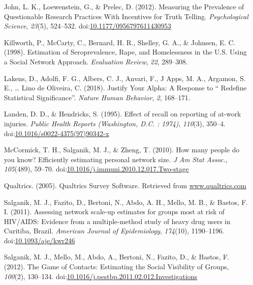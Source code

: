 \documentclass[jou]{apa6}
\theoremstyle{definition}
\theoremstyle{definition}
\theoremstyle{definition}
\theoremstyle{remark}
\begin{document}
\hypertarget{ref-John2012}{}
John, L. K., Loewenstein, G., \& Prelec, D. (2012). Measuring the
Prevalence of Questionable Research Practices With Incentives for Truth
Telling. \emph{Psychological Science}, \emph{23}(5), 524--532.
doi:\href{https://doi.org/10.1177/0956797611430953}{10.1177/0956797611430953}

\hypertarget{ref-Killworth1998a}{}
Killworth, P., McCarty, C., Bernard, H. R., Shelley, G. A., \& Johnsen,
E. C. (1998). Estimation of Seroprevalence, Rape, and Homelessness in
the U.S. Using a Social Network Approach. \emph{Evaluation Review},
\emph{22}, 289--308.

\hypertarget{ref-Lakensabc1860}{}
Lakens, D., Adolfi, F. G., Albers, C. J., Anvari, F., J Apps, M. A.,
Argamon, S. E., \ldots{} Lino de Oliveira, C. (2018). Justify Your
Alpha: A Response to `` Redefine Statistical Significance''.
\emph{Nature Human Behavior}, \emph{2}, 168--171.

\hypertarget{ref-Landen1995}{}
Landen, D. D., \& Hendricks, S. (1995). Effect of recall on reporting of
at-work injuries. \emph{Public Health Reports (Washington, D.C. :
1974)}, \emph{110}(3), 350--4.
doi:\href{https://doi.org/10.1016/s0022-4375(97)90342-x}{10.1016/s0022-4375(97)90342-x}

\hypertarget{ref-McCormick2010}{}
McCormick, T. H., Salganik, M. J., \& Zheng, T. (2010). How many people
do you know? Efficiently estimating personal network size. \emph{J Am
Stat Assoc.}, \emph{105}(489), 59--70.
doi:\href{https://doi.org/10.1016/j.immuni.2010.12.017.Two-stage}{10.1016/j.immuni.2010.12.017.Two-stage}

\hypertarget{ref-Qualtrics}{}
Qualtrics. (2005). Qualtrics Survey Software. Retrieved from
\url{www.qualtrics.com}

\hypertarget{ref-Salganik2011}{}
Salganik, M. J., Fazito, D., Bertoni, N., Abdo, A. H., Mello, M. B., \&
Bastos, F. I. (2011). Assessing network scale-up estimates for groups
most at risk of HIV/AIDS: Evidence from a multiple-method study of heavy
drug users in Curitiba, Brazil. \emph{American Journal of Epidemiology},
\emph{174}(10), 1190--1196.
doi:\href{https://doi.org/10.1093/aje/kwr246}{10.1093/aje/kwr246}

\hypertarget{ref-Salganik2012}{}
Salganik, M. J., Mello, M., Abdo, A., Bertoni, N., Fazito, D., \&
Bastos, F. (2012). The Game of Contacts: Estimating the Social
Visibility of Groups, \emph{100}(2), 130--134.
doi:\href{https://doi.org/10.1016/j.pestbp.2011.02.012.Investigations}{10.1016/j.pestbp.2011.02.012.Investigations}
\end{document}
